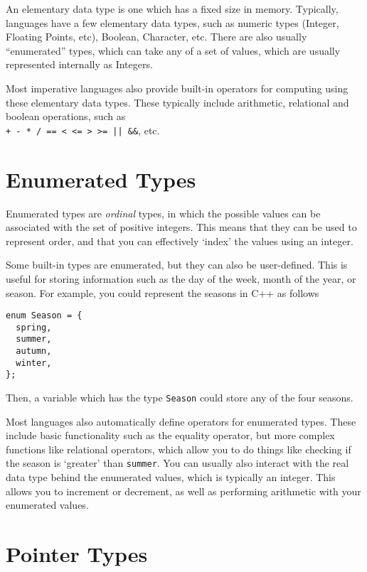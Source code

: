 
An elementary data type is one which has a fixed size in memory. Typically, languages have a few elementary data types,
 such as numeric types (Integer, Floating Points, etc), Boolean, Character, etc. There are also usually ``enumerated''
 types, which can take any of a set of values, which are usually represented internally as Integers.

Most imperative languages also provide built-in operators for computing using these elementary data types. These
 typically include arithmetic, relational and boolean operations, such as\\\verb`+ - * / == < <= > >= || &&`, etc.

\section*{Enumerated Types}

Enumerated types are \textit{ordinal} types, in which the possible values can be associated with the set of positive
 integers. This means that they can be used to represent order, and that you can effectively `index' the values using
 an integer.

Some built-in types are enumerated, but they can also be user-defined. This is useful for storing information such as
 the day of the week, month of the year, or season. For example, you could represent the seasons in C++ as follows
\begin{verbatim}
enum Season = {
  spring,
  summer,
  autumn,
  winter,
};
\end{verbatim}
Then, a variable which has the type \verb`Season` could store any of the four seasons.

Most languages also automatically define operators for enumerated types. These include basic functionality such as the
 equality operator, but more complex functions like relational operators, which allow you to do things like checking if
 the season is `greater' than \verb`summer`. You can usually also interact with the real data type behind the enumerated
 values, which is typically an integer. This allows you to increment or decrement, as well as performing arithmetic with
 your enumerated values.

\section*{Pointer Types}

